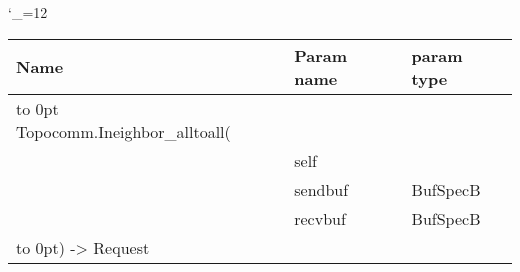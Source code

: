 \begingroup \catcode`\_=12 \tt
\begin{tabular}{lll}
\toprule
\textrm{Name}&\textrm{Param name}&\textrm{param type}\\
\midrule
\hbox to 0pt {Topocomm.Ineighbor_alltoall(\hss}\\
& self\\
& sendbuf & BufSpecB\\
& recvbuf & BufSpecB\\
\hbox to 0pt{) -> Request\hss}\\
\bottomrule
\end{tabular}
\endgroup
